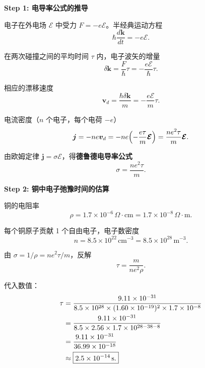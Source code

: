 \begin{derivationbox}[标准解题过程]
\textbf{Step 1: 电导率公式的推导}

电子在外电场 $\mathcal{E}$ 中受力 $F=-e\mathcal{E}$。半经典运动方程
\begin{equation}
\hbar\frac{d\bm{k}}{dt}=-e\bm{\mathcal{E}}.
\end{equation}

在两次碰撞之间的平均时间 $\tau$ 内，电子波矢的增量
\begin{equation}
\delta\bm{k}=\frac{F}{\hbar}\tau=-\frac{e\bm{\mathcal{E}}}{\hbar}\tau.
\end{equation}

相应的漂移速度
\begin{equation}
\bm{v}_d=\frac{\hbar\delta\bm{k}}{m}=-\frac{e\bm{\mathcal{E}}}{m}\tau.
\end{equation}

电流密度（$n$ 个电子，每个电荷 $-e$）
\begin{equation}
\bm{j}=-ne\bm{v}_d=-ne\Bigl(-\frac{e\tau}{m}\bm{\mathcal{E}}\Bigr)=\frac{ne^2\tau}{m}\bm{\mathcal{E}}.
\end{equation}

由欧姆定律 $\bm{j}=\sigma\bm{\mathcal{E}}$，得\textbf{德鲁德电导率公式}
\begin{equation}
\boxed{\sigma=\frac{ne^2\tau}{m}.}
\end{equation}

\textbf{Step 2: 铜中电子弛豫时间的估算}

铜的电阻率
\begin{equation}
\rho=1.7\times10^{-6}\,\Omega\cdot\text{cm}=1.7\times10^{-8}\,\Omega\cdot\text{m}.
\end{equation}

每个铜原子贡献 1 个自由电子，电子数密度
\begin{equation}
n=8.5\times10^{22}\,\text{cm}^{-3}=8.5\times10^{28}\,\text{m}^{-3}.
\end{equation}

由 $\sigma=1/\rho=ne^2\tau/m$，反解
\begin{equation}
\tau=\frac{m}{ne^2\rho}.
\end{equation}

代入数值：
\begin{align}
\tau&=\frac{9.11\times10^{-31}}{8.5\times10^{28}\times(1.60\times10^{-19})^2\times1.7\times10^{-8}} \notag\\
&=\frac{9.11\times10^{-31}}{8.5\times2.56\times1.7\times10^{28-38-8}} \notag\\
&=\frac{9.11\times10^{-31}}{36.99\times10^{-18}} \notag\\
&\approx\boxed{2.5\times10^{-14}\,\text{s}.}
\end{align}
\end{derivationbox}

